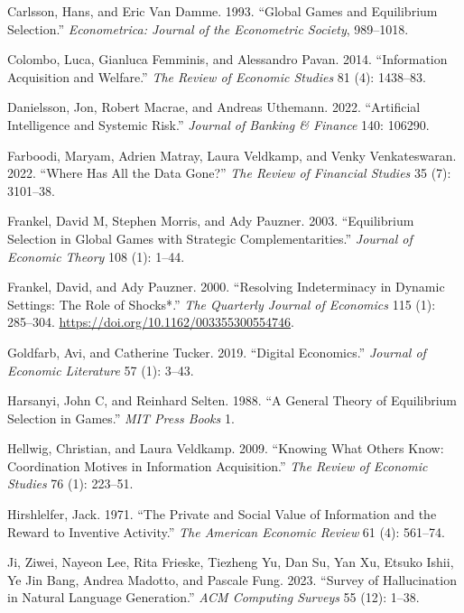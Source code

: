 \documentclass[
]{article}
\newlength{\cslhangindent}
\newenvironment{CSLReferences}[2] %
 {\begin{list}{}{%
  \setlength{\itemindent}{0pt}
  \setlength{\leftmargin}{0pt}
  \setlength{\parsep}{0pt}
  \ifodd #1
   \setlength{\leftmargin}{\cslhangindent}
   \setlength{\itemindent}{-1\cslhangindent}
  \fi
  \setlength{\itemsep}{#2\baselineskip}}}
 {\end{list}}
\theoremstyle{plain}
\theoremstyle{remark}
\begin{document}
\begin{CSLReferences}{1}{0}
Carlsson, Hans, and Eric Van Damme. 1993. {``Global Games and
Equilibrium Selection.''} \emph{Econometrica: Journal of the Econometric
Society}, 989--1018.

Colombo, Luca, Gianluca Femminis, and Alessandro Pavan. 2014.
{``Information Acquisition and Welfare.''} \emph{The Review of Economic
Studies} 81 (4): 1438--83.

Danielsson, Jon, Robert Macrae, and Andreas Uthemann. 2022.
{``Artificial Intelligence and Systemic Risk.''} \emph{Journal of
Banking \& Finance} 140: 106290.

Farboodi, Maryam, Adrien Matray, Laura Veldkamp, and Venky
Venkateswaran. 2022. {``Where Has All the Data Gone?''} \emph{The Review
of Financial Studies} 35 (7): 3101--38.

Frankel, David M, Stephen Morris, and Ady Pauzner. 2003. {``Equilibrium
Selection in Global Games with Strategic Complementarities.''}
\emph{Journal of Economic Theory} 108 (1): 1--44.

Frankel, David, and Ady Pauzner. 2000. {``{Resolving Indeterminacy in
Dynamic Settings: The Role of Shocks*}.''} \emph{The Quarterly Journal
of Economics} 115 (1): 285--304.
\url{https://doi.org/10.1162/003355300554746}.

Goldfarb, Avi, and Catherine Tucker. 2019. {``Digital Economics.''}
\emph{Journal of Economic Literature} 57 (1): 3--43.

Harsanyi, John C, and Reinhard Selten. 1988. {``A General Theory of
Equilibrium Selection in Games.''} \emph{MIT Press Books} 1.

Hellwig, Christian, and Laura Veldkamp. 2009. {``Knowing What Others
Know: Coordination Motives in Information Acquisition.''} \emph{The
Review of Economic Studies} 76 (1): 223--51.

Hirshlelfer, Jack. 1971. {``The Private and Social Value of Information
and the Reward to Inventive Activity.''} \emph{The American Economic
Review} 61 (4): 561--74.

Ji, Ziwei, Nayeon Lee, Rita Frieske, Tiezheng Yu, Dan Su, Yan Xu, Etsuko
Ishii, Ye Jin Bang, Andrea Madotto, and Pascale Fung. 2023. {``Survey of
Hallucination in Natural Language Generation.''} \emph{ACM Computing
Surveys} 55 (12): 1--38.


\end{CSLReferences}
\end{document}
